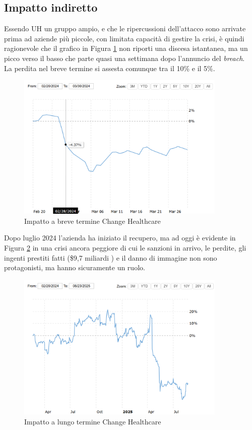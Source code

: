 \documentclass[12pt,a4paper,twoside]{report}
\begin{document}
\subsection{Impatto indiretto}
Essendo UH un gruppo ampio, e che le ripercussioni dell'attacco sono arrivate prima ad aziende pi\`u piccole, con limitata capacit\`a di gestire la crisi, \`e quindi ragionevole che il grafico in Figura \ref{fig:chh1} \cite{macrotrends_unhealth} non riporti una discesa istantanea, ma un picco verso il basso che parte quasi una settimana dopo l'annuncio del \textit{breach}.\\
La perdita nel breve termine si assesta comunque tra il 10\% e il 5\%.\\
\begin{figure}[H] 
\begin{center} 
\includegraphics[width=10cm]{figures/chHealth_short.png} 
\caption[Grafico Change Healthcare short]{Impatto a breve termine Change Healthcare}\label{fig:chh1}
\end{center}
\end{figure}

Dopo luglio 2024 l'azienda ha iniziato il recupero, ma ad oggi \`e evidente in Figura \ref{fig:chh2} \cite{macrotrends_unhealth} in una crisi ancora peggiore di cui le sanzioni in arrivo, le perdite, gli ingenti prestiti fatti (\$9,7 miliardi \cite{ChHealth_lessons}) e il danno di immagine non sono protagonisti, ma hanno sicuramente un ruolo.\\

\begin{figure}[H] 
\begin{center} 
\includegraphics[width=10cm]{figures/chHealth_long.png} 
\caption[Grafico Change Healthcare long]{Impatto a lungo termine  Change Healthcare}\label{fig:chh2}
\end{center}
\end{figure}
\end{document}
